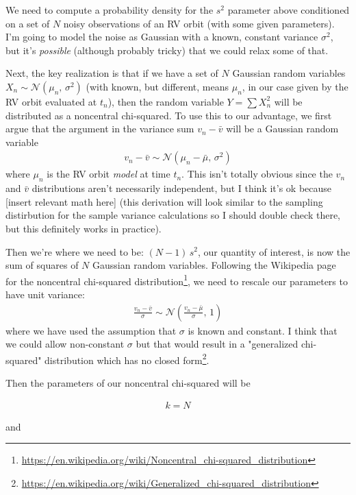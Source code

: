 \documentclass[modern, letterpaper]{aastex631}
\begin{document}
We need to compute a probability density for the $s^2$ parameter above conditioned on a set of $N$ noisy observations of an RV orbit (with some given parameters).
I'm going to model the noise as Gaussian with a known, constant variance $\sigma^2$, but it's \emph{possible} (although probably tricky) that we could relax some of that.

Next, the key realization is that if we have a set of $N$ Gaussian random variables $X_n \sim \mathcal{N}\left(\mu_n,\,\sigma^2\right)$ (with known, but different, means $\mu_n$, in our case given by the RV orbit evaluated at $t_n$), then the random variable $Y = \sum X_n^2$ will be distributed as a noncentral chi-squared.
To use this to our advantage, we first argue that the argument in the variance sum $v_n - \bar{v}$ will be a Gaussian random variable
\begin{eqnarray}
	v_n - \bar{v} \sim \mathcal{N}\left(\mu_n - \bar{\mu},\,\sigma^2\right)
\end{eqnarray}
where $\mu_n$ is the RV orbit \emph{model} at time $t_n$.
This isn't totally obvious since the $v_n$ and $\bar{v}$ distributions aren't necessarily independent, but I think it's ok because [insert relevant math here] (this derivation will look similar to the sampling distirbution for the sample variance calculations so I should double check there, but this definitely works in practice).

Then we're where we need to be: $(N - 1)\,s^2$, our quantity of interest, is now the sum of squares of $N$ Gaussian random variables.
Following the Wikipedia page for the noncentral chi-squared distribution\footnote{\url{https://en.wikipedia.org/wiki/Noncentral_chi-squared_distribution}}, we need to rescale our parameters to have unit variance:
\begin{eqnarray}
	\frac{v_n - \bar{v}}{\sigma} \sim \mathcal{N}\left(\frac{v_n - \bar{\mu}}{\sigma},\,1\right)
\end{eqnarray}
where we have used the assumption that $\sigma$ is known and constant.
I think that we could allow non-constant $\sigma$ but that would result in a "generalized chi-squared" distribution which has no closed form\footnote{\url{https://en.wikipedia.org/wiki/Generalized_chi-squared_distribution}}.

Then the parameters of our noncentral chi-squared will be

\begin{eqnarray}
	k = N
\end{eqnarray}

and
\end{document}
